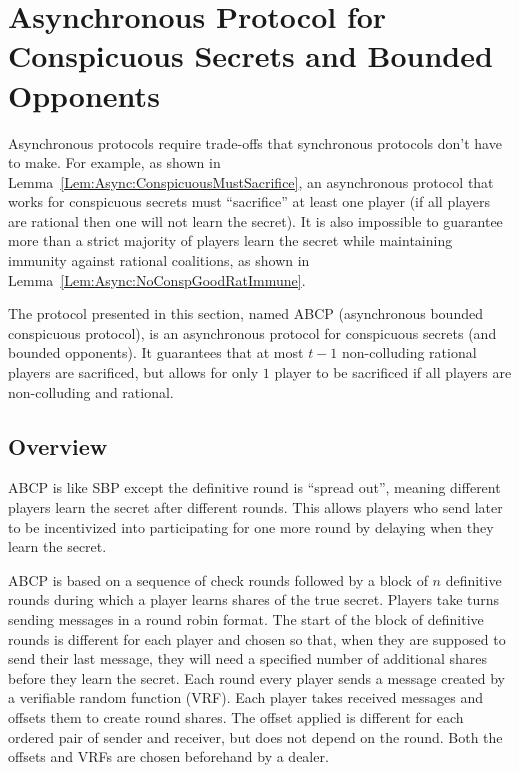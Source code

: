 \documentclass[12pt]{dalcsthesis}
\begin{document}
 




\section{Asynchronous Protocol for Conspicuous Secrets and Bounded Opponents}
\label{Sec:ABCP}

Asynchronous protocols require trade-offs that synchronous protocols don't have to make. For example, as shown in Lemma~\ref{Lem:Async:ConspicuousMustSacrifice}, an asynchronous protocol that works for conspicuous secrets must ``sacrifice'' at least one player (if all players are rational then one will not learn the secret). It is also impossible to guarantee more than a strict majority of players learn the secret while maintaining immunity against rational coalitions, as shown in Lemma~\ref{Lem:Async:NoConspGoodRatImmune}.

The protocol presented in this section, named ABCP (asynchronous bounded conspicuous protocol), is an asynchronous protocol for conspicuous secrets (and bounded opponents). It guarantees that at most $t-1$ non-colluding rational players are sacrificed, but allows for only $1$ player to be sacrificed if all players are non-colluding and rational.

\subsection{Overview}

ABCP is like SBP except the definitive round is ``spread out'', meaning different players learn the secret after different rounds. This allows players who send later to be incentivized into participating for one more round by delaying when they learn the secret.
 
ABCP is based on a sequence of check rounds followed by a block of $n$ definitive rounds during which a player learns shares of the true secret. Players take turns sending messages in a round robin format. The start of the block of definitive rounds is different for each player and chosen so that, when they are supposed to send their last message, they will need a specified number of additional shares before they learn the secret. Each round every player sends a message created by a verifiable random function (VRF). Each player takes received messages and offsets them to create round shares. The offset applied is different for each ordered pair of sender and receiver, but does not depend on the round. Both the offsets and VRFs are chosen beforehand by a dealer.
\end{document}
